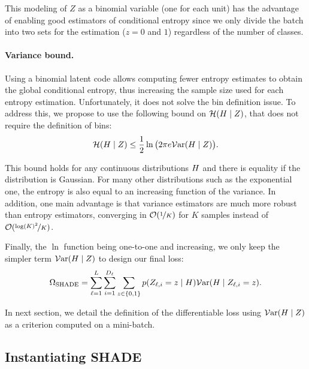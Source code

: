         This modeling of $Z$ as a binomial variable (one for each unit) has the advantage of enabling good estimators of conditional entropy since we only divide the batch into two sets for the estimation ($z=0$ and $1$) regardless of the number of classes.
        
        
    \paragraph{Variance bound.}
        Using a binomial latent code allows computing fewer entropy estimates to obtain the global conditional entropy, thus increasing the sample size used for each entropy estimation. Unfortunately, it does not solve the bin definition issue. To address this, we propose to use the following bound on $\mathcal{H}(H\mid Z)$, that does not require the definition of bins:
        \begin{equation}
            \label{shadeA:variancebound}
            \mathcal{H}(H \mid Z) \le \frac{1}{2}\ln\big(2 \pi e \mathcal{V}\mathrm{ar}(H\mid Z)\big).
        \end{equation}
        
        This bound holds for any continuous distributions $H$ and there is equality if the distribution is Gaussian. For many other distributions such as the exponential one, the entropy is also equal to an increasing function of the variance. In addition, one main advantage is that variance estimators are much more robust than entropy estimators, converging in $\mathcal{O}(\nicefrac{1}{K})$ for $K$ samples instead of $\mathcal{O}(\nicefrac{\log(K)^2}{K})$.
        
        Finally, the $\ln$ function being one-to-one and increasing, we only keep the simpler term $\mathcal{V}\mathrm{ar}(H\mid Z)$ to design our final loss:
        \begin{equation}
            \Omega_\mathrm{SHADE} = \sum_{\ell=1}^{L}\sum_{i=1}^{D_\ell}\sum_{z \in \{0,1\}} p(Z_{\ell,i} = z \mid H) \mathcal{V}\mathrm{ar}(H\mid Z_{\ell,i}=z).
        \end{equation}
        
        In next section, we detail the definition of the differentiable loss using $\mathcal{V}\mathrm{ar}(H\mid Z)$ as a criterion computed on a mini-batch.
        
    \subsection{Instantiating SHADE}   
    \label{shadeA:instance}

